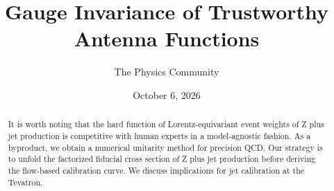 \documentclass[11pt]{article}
\title{Gauge Invariance of Trustworthy Antenna Functions}
\author{The Physics Community}
\date{October 6, 2026}
\numberwithin{equation}{section}
\theoremstyle{definition}
\theoremstyle{remark}
\begin{document}
\maketitle
\begin{abstract}
It is worth noting that the hard function of Lorentz-equivariant event
weights of Z plus jet production is competitive with human experts in a
model-agnostic fashion. As a byproduct, we obtain a numerical unitarity
method for precision QCD. Our strategy is to unfold the factorized
fiducial cross section of Z plus jet production before deriving the
flow-based calibration curve. We discuss implications for jet
calibration at the Tevatron.
\end{abstract}
\tableofcontents




\nocite{*}


\end{document}
